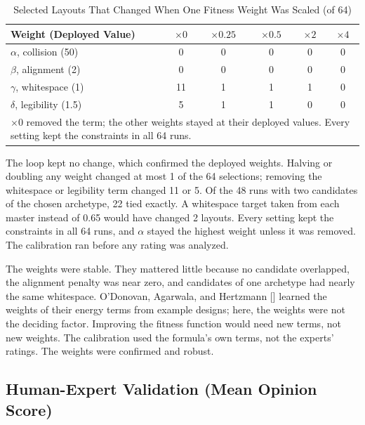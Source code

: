 \begin{refsection}
\begin{table}[!ht]
\centering
\caption{Selected Layouts That Changed When One Fitness Weight Was Scaled (of 64)}
\label{tab:calibration}
\begin{tabular}{l c c c c c}
\hline
\textbf{Weight (Deployed Value)} & \textbf{$\times 0$} & \textbf{$\times 0.25$} & \textbf{$\times 0.5$} & \textbf{$\times 2$} & \textbf{$\times 4$} \\ \hline
$\alpha$, collision (50) & 0 & 0 & 0 & 0 & 0 \\
$\beta$, alignment (2) & 0 & 0 & 0 & 0 & 0 \\
$\gamma$, whitespace (1) & 11 & 1 & 1 & 1 & 0 \\
$\delta$, legibility (1.5) & 5 & 1 & 1 & 0 & 0 \\ \hline
\multicolumn{6}{p{0.80\textwidth}}{\footnotesize $\times 0$ removed the term; the other weights stayed at their deployed values. Every setting kept the constraints in all 64 runs.}
\end{tabular}
\end{table}

The loop kept no change, which confirmed the deployed weights. Halving or doubling any weight changed at most 1 of the 64 selections; removing the whitespace or legibility term changed 11 or 5. Of the 48 runs with two candidates of the chosen archetype, 22 tied exactly. A whitespace target taken from each master instead of 0.65 would have changed 2 layouts. Every setting kept the constraints in all 64 runs, and $\alpha$ stayed the highest weight unless it was removed. The calibration ran before any rating was analyzed.

The weights were stable. They mattered little because no candidate overlapped, the alignment penalty was near zero, and candidates of one archetype had nearly the same whitespace. O'Donovan, Agarwala, and Hertzmann [\citeyear{ODonovan2014Layouts}] learned the weights of their energy terms from example designs; here, the weights were not the deciding factor. Improving the fitness function would need new terms, not new weights. The calibration used the formula's own terms, not the experts' ratings. The weights were confirmed and robust.

\clearpage
\subsection{Human-Expert Validation (Mean Opinion Score)}


\end{refsection}
